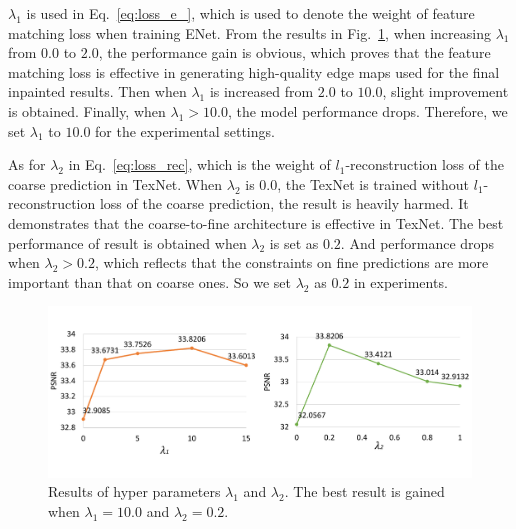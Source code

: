 $\lambda_1$ is used in Eq.~\eqref{eq:loss_e_}, which is used to denote the weight of feature matching loss when training ENet. %
From the results in Fig.~\ref{fig:hparam}, when increasing $\lambda_1$ from $0.0$ to $2.0$, the performance gain is obvious, which proves that the feature matching loss is effective in
generating high-quality edge maps used for the final inpainted results. 
Then when $\lambda_1$ is increased from $2.0$ to $10.0$, slight improvement is obtained.
Finally, when $\lambda_1>10.0$, the model performance drops.
Therefore, we set $\lambda_1$ to $10.0$ for the experimental settings.

As for $\lambda_2$ in Eq.~\eqref{eq:loss_rec}, which is the weight of $l_1$-reconstruction loss of the coarse prediction in TexNet. When $\lambda_2$ is $0.0$, the TexNet is trained without $l_1$-reconstruction loss of the coarse prediction, the result is heavily harmed. It demonstrates that the coarse-to-fine architecture is effective in TexNet. The best performance of result is obtained when $\lambda_2$ is set as $0.2$. And performance drops when $\lambda_2>0.2$, which reflects that the constraints on fine predictions are more important than that on coarse ones.
So we set $\lambda_2$ as $0.2$ in experiments.




\begin{figure}[!t]
	\centering
	\includegraphics[width=1.0\columnwidth]{lamda1} %
	\caption{Results of hyper parameters $\lambda_1$ and $\lambda_2$. The best result is gained when $\lambda_1=10.0$ and $\lambda_2=0.2$.}
	\label{fig:hparam}
\end{figure}






 

